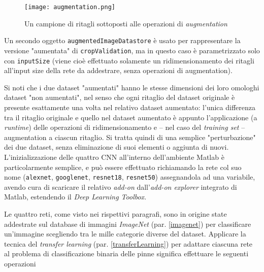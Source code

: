 \begin{figure}[h!]
  \centering
  \texttt{[image: augmentation.png]}
  \caption{Un campione di ritagli sottoposti alle operazioni di \textit{augmentation}}
  \label{fig:augmentation}
\end{figure}

Un secondo oggetto \verb|augmentedImageDatastore| è usato per rappresentare la versione "aumentata" di \verb|cropValidation|, ma in questo caso è parametrizzato solo con \verb|inputSize| (viene cioè effettuato solamente un ridimensionamento dei ritagli all'input size della rete da addestrare, senza operazioni di augmentation).

Si noti che i due dataset "aumentati" hanno le stesse dimensioni dei loro omologhi dataset "non aumentati", nel senso che ogni ritaglio del dataset originale è presente esattamente una volta nel relativo dataset aumentato: l'unica differenza tra il ritaglio originale e quello nel dataset aumentato è appunto l'applicazione (a \textit{runtime}) delle operazioni di ridimensionamento e -- nel caso del \textit{training set} -- augmentation a ciascun ritaglio. Si tratta quindi di una semplice "perturbazione" dei due dataset, senza eliminazione di suoi elementi o aggiunta di nuovi.\\

L'inizializzazione delle quattro CNN all'interno dell'ambiente Matlab è particolarmente semplice, e può essere effettuato richiamando la rete col suo nome (\verb|alexnet|, \verb|googlenet|, \verb|resnet18|, \verb|resnet50|) assegnandola ad una variabile, avendo cura di scaricare il relativo \textit{add-on} dall'\textit{add-on explorer} integrato di Matlab, estendendo il \textit{Deep Learning Toolbox}.

Le quattro reti, come visto nei rispettivi paragrafi, sono in origine state addestrate sul database di immagini \textit{ImageNet} (par. \ref{imagenet}) per classificare un'immagine scegliendo tra le mille categorie diverse del dataset. Applicare la tecnica del \textit{transfer learning} (par. \ref{transferLearning}) per adattare ciascuna rete al problema di classificazione binaria delle pinne significa effettuare le seguenti operazioni

